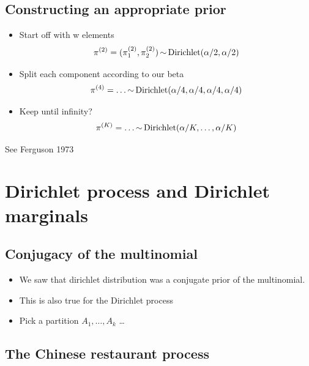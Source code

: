 \documentclass[b5paper]{report}
\begin{document}
\subsection{Constructing an appropriate prior}

\begin{itemize}
  \item Start off with w elements
    \begin{equation}
      \pi^{(2)} = (\pi_1^{(2)}, \pi_2^{(2)}) \operatorname*{\sim} \text{Dirichlet}(\alpha/2,
      \alpha/2)
    \end{equation}
  \item Split each component according to our beta
    \begin{align}
      \pi^{(4)} = \dots \operatorname*{\sim} \text{Dirichlet}(\alpha/4,
      \alpha/4,\alpha/4,\alpha/4)
    \end{align}
  \item Keep until infinity?
    \begin{align}
      \pi^{(K)} = \dots \operatorname*{\sim} \text{Dirichlet}(\alpha/K,\dots,\alpha/K)
    \end{align}
\end{itemize}

See Ferguson 1973 \cite{ferguson1973bayesian}

\section{Dirichlet process and Dirichlet marginals}

\subsection{Conjugacy of the multinomial}

\begin{itemize}
  \item We saw that dirichlet distribution was a conjugate prior of the
    multinomial.
  \item This is also true for the Dirichlet process
  \item Pick a partition $A_1,\dots,A_k$ \dots
\end{itemize}

\subsection{The Chinese restaurant process}
\end{document}
